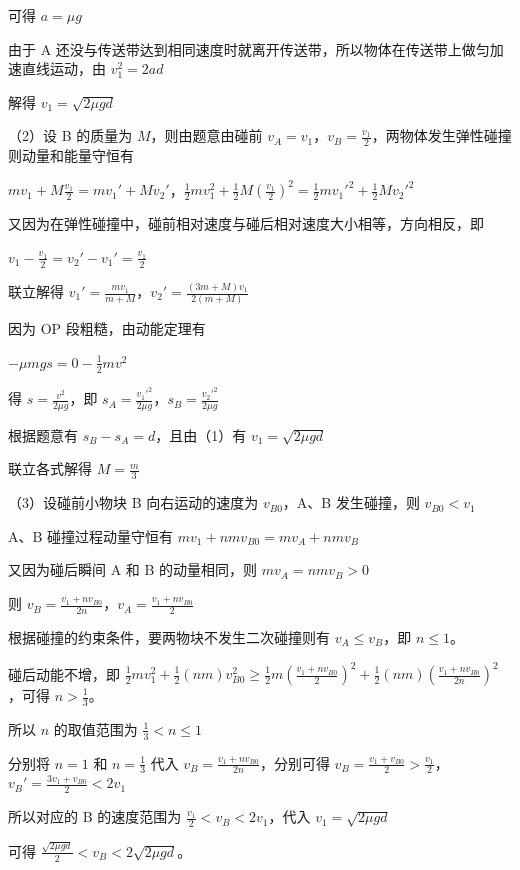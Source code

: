 \documentclass[\gkver]{gaokaozhenti}
\begin{document}
\begin{enumerate}
{可得 $a = \mu g$

由于 A 还没与传送带达到相同速度时就离开传送带，所以物体在传送带上做匀加速直线运动，由 $v_{1}^{2} = 2ad$

解得 $v_{1} = \sqrt{2\mu gd}$

（2）设 B 的质量为 $M$，则由题意由碰前 $v_{A} = v_{1}$，$v_{B} = \frac{v_{1}}{2}$，两物体发生弹性碰撞则动量和能量守恒有

$mv_{1} + M\frac{v_{1}}{2} = mv_{1}' + Mv_{2}'$，$\frac{1}{2}mv_{1}^{2} + \frac{1}{2}M\left(\frac{v_{1}}{2}\right)^{2} = \frac{1}{2}mv_{1}'^{2} + \frac{1}{2}Mv_{2}'^{2}$

又因为在弹性碰撞中，碰前相对速度与碰后相对速度大小相等，方向相反，即

$v_{1} - \frac{v_{1}}{2} = v_{2}' - v_{1}' = \frac{v_{1}}{2}$

联立解得 $v_{1}' = \frac{mv_{1}}{m+M}$，$v_{2}' = \frac{(3m+M)v_{1}}{2(m+M)}$

因为 OP 段粗糙，由动能定理有

$-\mu mgs = 0 - \frac{1}{2}mv^{2}$

得 $s = \frac{v^{2}}{2\mu g}$，即 $s_{A} = \frac{v_{1}'^{2}}{2\mu g}$，$s_{B} = \frac{v_{2}'^{2}}{2\mu g}$

根据题意有 $s_{B} - s_{A} = d$，且由（1）有 $v_{1} = \sqrt{2\mu gd}$

联立各式解得 $M = \frac{m}{3}$

（3）设碰前小物块 B 向右运动的速度为 $v_{B0}$，A、B 发生碰撞，则 $v_{B0} < v_{1}$

A、B 碰撞过程动量守恒有 $mv_{1} + nmv_{B0} = mv_{A} + nmv_{B}$

又因为碰后瞬间 A 和 B 的动量相同，则 $mv_{A} = nmv_{B} > 0$

则 $v_{B} = \frac{v_{1} + nv_{B0}}{2n}$，$v_{A} = \frac{v_{1} + nv_{B0}}{2}$

根据碰撞的约束条件，要两物块不发生二次碰撞则有 $v_{A} \le v_{B}$，即 $n \le 1$。

碰后动能不增，即 $\frac{1}{2}mv_{1}^{2} + \frac{1}{2}(nm)v_{B0}^{2} \ge \frac{1}{2}m\left(\frac{v_{1} + nv_{B0}}{2}\right)^{2} + \frac{1}{2}(nm)\left(\frac{v_{1} + nv_{B0}}{2n}\right)^{2}$，可得 $n > \frac{1}{3}$。

所以 $n$ 的取值范围为 $\frac{1}{3} < n \le 1$

分别将 $n = 1$ 和 $n = \frac{1}{3}$ 代入 $v_{B} = \frac{v_{1} + nv_{B0}}{2n}$，分别可得 $v_{B} = \frac{v_{1} + v_{B0}}{2} > \frac{v_{1}}{2}$，$v_{B}' = \frac{3v_{1} + v_{B0}}{2} < 2v_{1}$

所以对应的 B 的速度范围为 $\frac{v_{1}}{2} < v_{B} < 2v_{1}$，代入 $v_{1} = \sqrt{2\mu gd}$

可得 $\frac{\sqrt{2\mu gd}}{2} < v_{B} < 2\sqrt{2\mu gd}$。
}

\end{enumerate}
\end{document}
